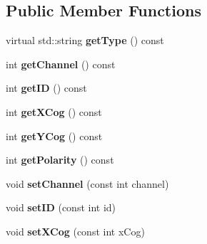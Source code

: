 \subsection*{Public Member Functions}
\begin{DoxyCompactItemize}
\item 
virtual std\+::string {\bfseries get\+Type} () const \hypertarget{classev_1_1ClusterEvent_a2b6c1d4d12960ab15433c2dbb57842a2}{}\label{classev_1_1ClusterEvent_a2b6c1d4d12960ab15433c2dbb57842a2}

\item 
int {\bfseries get\+Channel} () const \hypertarget{classev_1_1ClusterEvent_ad43d3e3e1a3f1ccd5aeb648c9e6154c2}{}\label{classev_1_1ClusterEvent_ad43d3e3e1a3f1ccd5aeb648c9e6154c2}

\item 
int {\bfseries get\+ID} () const \hypertarget{classev_1_1ClusterEvent_a007e8b487445ea71d1bff82f3d59fdec}{}\label{classev_1_1ClusterEvent_a007e8b487445ea71d1bff82f3d59fdec}

\item 
int {\bfseries get\+X\+Cog} () const \hypertarget{classev_1_1ClusterEvent_a30e569d0ca23b77e2da9bd4a98b94fc7}{}\label{classev_1_1ClusterEvent_a30e569d0ca23b77e2da9bd4a98b94fc7}

\item 
int {\bfseries get\+Y\+Cog} () const \hypertarget{classev_1_1ClusterEvent_a46e89174921f68a96e45fe61273fac3a}{}\label{classev_1_1ClusterEvent_a46e89174921f68a96e45fe61273fac3a}

\item 
int {\bfseries get\+Polarity} () const \hypertarget{classev_1_1ClusterEvent_a8af0afe7b7c9879f3d3ff721b12d3459}{}\label{classev_1_1ClusterEvent_a8af0afe7b7c9879f3d3ff721b12d3459}

\item 
void {\bfseries set\+Channel} (const int channel)\hypertarget{classev_1_1ClusterEvent_aeabb79032ebd04cd7802cfda38c24389}{}\label{classev_1_1ClusterEvent_aeabb79032ebd04cd7802cfda38c24389}

\item 
void {\bfseries set\+ID} (const int id)\hypertarget{classev_1_1ClusterEvent_a82a500a0a8bfcc84d6a1b46c816d6ea7}{}\label{classev_1_1ClusterEvent_a82a500a0a8bfcc84d6a1b46c816d6ea7}

\item 
void {\bfseries set\+X\+Cog} (const int x\+Cog)\hypertarget{classev_1_1ClusterEvent_a3853aec21b42b82a8fde9b67131a5eee}{}\label{classev_1_1ClusterEvent_a3853aec21b42b82a8fde9b67131a5eee}


\end{DoxyCompactItemize}
